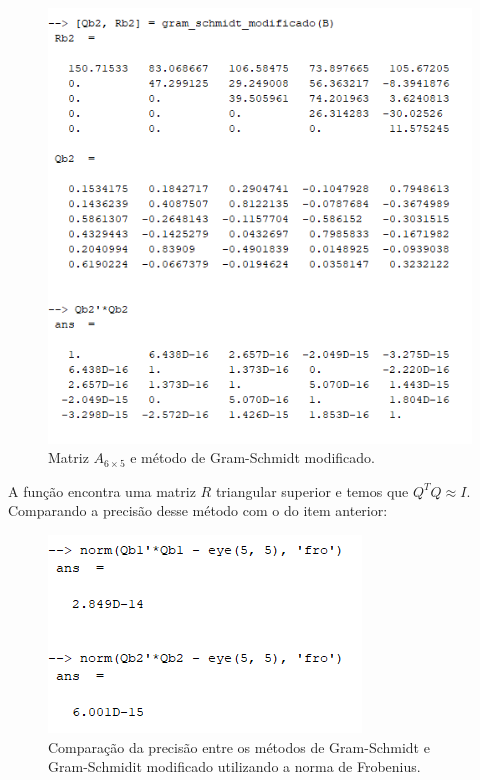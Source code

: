 \documentclass[11pt]{article}
\begin{document}
\begin{enumerate}
            \begin{figure}[H]
                \centering
                \includegraphics[]{2-3}
                \caption{Matriz $A_{6\times5}$ e método de Gram-Schmidt modificado.}
            \end{figure}
        
            A função encontra uma matriz $R$ triangular superior e temos que $Q^TQ \approx I$. Comparando a precisão desse método com o do item anterior:
        
            \begin{figure}[H]
                \centering
                \includegraphics[]{2-4}
                \caption{Comparação da precisão entre os métodos de Gram-Schmidt e Gram-Schmidit modificado utilizando a norma de Frobenius.}
            \end{figure}
            

\end{enumerate}
\end{document}
